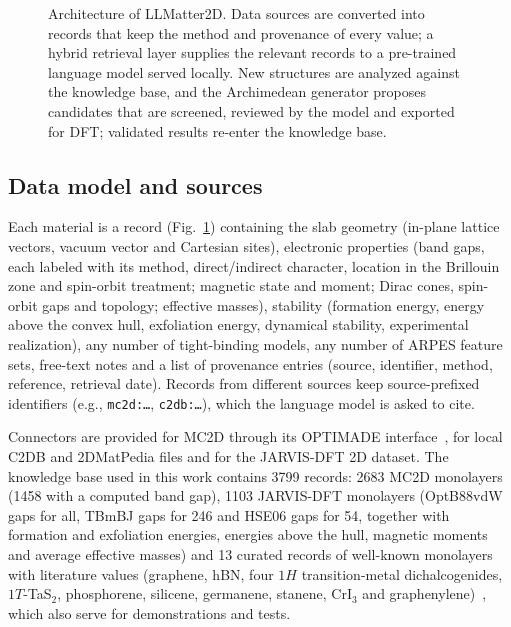 \documentclass[prmaterials,twocolumn,superscriptaddress,longbibliography,nofootinbib]{revtex4-2}
\newcommand{\code}[1]{\texttt{#1}}
\begin{document}
\begin{figure}[t]
\caption{Architecture of LLMatter2D. Data sources are converted into records that keep
the method and provenance of every value; a hybrid retrieval layer supplies the relevant
records to a pre-trained language model served locally. New structures are analyzed against
the knowledge base, and the Archimedean generator proposes candidates that are screened,
reviewed by the model and exported for DFT; validated results re-enter the knowledge base.}
\label{fig:architecture}
\end{figure}

\subsection{Data model and sources}

Each material is a record (Fig.~\ref{fig:architecture}) containing the slab geometry
(in-plane lattice vectors, vacuum vector and Cartesian sites), electronic properties (band
gaps, each labeled with its method, direct/indirect character, location in the Brillouin zone
and spin-orbit treatment; magnetic state and moment; Dirac cones, spin-orbit gaps and
topology; effective masses), stability (formation energy, energy above the convex hull,
exfoliation energy, dynamical stability, experimental realization), any number of
tight-binding models, any number of ARPES feature sets, free-text notes and a list of
provenance entries (source, identifier, method, reference, retrieval date). Records from
different sources keep source-prefixed identifiers (e.g., \code{mc2d:\ldots},
\code{c2db:\ldots}), which the language model is asked to cite.

Connectors are provided for MC2D through its OPTIMADE interface~\cite{Andersen2021}, for
local C2DB and 2DMatPedia files and for the JARVIS-DFT 2D dataset. The knowledge base used
in this work contains 3799 records: 2683 MC2D monolayers (1458 with a computed band gap),
1103 JARVIS-DFT monolayers (OptB88vdW gaps for all, TBmBJ gaps for 246 and HSE06 gaps for
54, together with formation and exfoliation energies, energies above the hull, magnetic
moments and average effective masses) and 13 curated records of well-known monolayers with
literature values (graphene, hBN, four $1H$ transition-metal dichalcogenides, $1T$-TaS$_2$,
phosphorene, silicene, germanene, stanene, CrI$_3$ and graphenylene)~\cite{CastroNeto2009,
Mak2010,Liu2011,Xu2013,Huang2017,Bostwick2007,Miwa2015,Zhang2014,Elias2019,Song2013}, which
also serve for demonstrations and tests.
\end{document}
